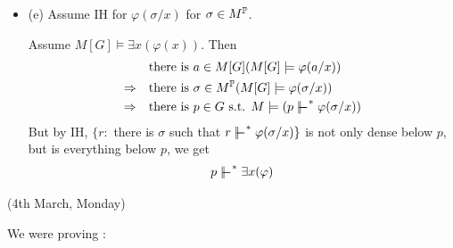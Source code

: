\documentclass[12pt,a4paper]{article}
\newenvironment{proof}
{\begin{changemargin}{0.5cm}{0.5cm} 
	}%
	{\end{changemargin}
}
\renewenvironment{i}
{\begin{itemize} 
	}%
	{\end{itemize}
}
\newenvironment{p}
{\begin{proof} 
	}%
	{\end{proof}
}
\begin{document}
\begin{p}
\begin{i}
Now assume that $p\in G (p\forces^* \neg \varphi)$. Suppose $M[G] \models \varphi$ (for contradiction.) By IH, we may find $q\in G(q\forces^*\varphi)$. Find $r\leq p, q$ with $r\in G$. By lemma, $r\forces^* \varphi$ but by definition of $p\forces^* \neg \varphi$, has $r\not\forces^* \varphi$, a contradiction.
\item[(e)] Assume IH for $\varphi (\sigma/x)$ for $\sigma \in M^{\mathbb{P}}$.

\quad Assume $M[G] \models \exists x(\varphi(x))$. Then
\begin{align*}
& \text{there is } a\in  M[G] (M[G] \models \varphi (a/x)) \\
\Rightarrow \quad & \text{there is } \sigma\in M^{\poset}(M[G] \models \varphi(\sigma/x)) \\
\Rightarrow \quad & \text{there is } p\in G \text{ s.t. } M\models (p\forces^* \varphi(\sigma/x))
\end{align*}
But by IH, $\{r : $ there is $\sigma$ such that $r\forces^* \varphi(\sigma/x) \}$ is not only dense below $p$, but is everything below $p$, we get
\begin{align*}
p \forces^* \exists x(\varphi)
\end{align*}
\end{i} 
\end{p}
\s

\newday

(4th March, Monday)
\s

We were proving :
\end{document}
